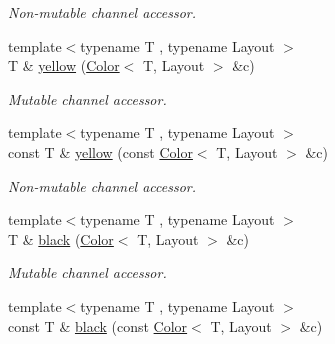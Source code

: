 \begin{DoxyCompactItemize}
\begin{DoxyCompactList}\small\item\em Non-\/mutable channel accessor. \end{DoxyCompactList}\item 
\hypertarget{group___channel_accessors_ga6829ee374a312a1029a0148235540de3}{{\footnotesize template$<$typename T , typename Layout $>$ }\\T \& \hyperlink{group___channel_accessors_ga6829ee374a312a1029a0148235540de3}{yellow} (\hyperlink{class_d_o_1_1_color}{Color}$<$ T, Layout $>$ \&c)}\label{group___channel_accessors_ga6829ee374a312a1029a0148235540de3}

\begin{DoxyCompactList}\small\item\em Mutable channel accessor. \end{DoxyCompactList}\item 
\hypertarget{group___channel_accessors_gac23bd53f11255e8179ab89bf48d050d1}{{\footnotesize template$<$typename T , typename Layout $>$ }\\const T \& \hyperlink{group___channel_accessors_gac23bd53f11255e8179ab89bf48d050d1}{yellow} (const \hyperlink{class_d_o_1_1_color}{Color}$<$ T, Layout $>$ \&c)}\label{group___channel_accessors_gac23bd53f11255e8179ab89bf48d050d1}

\begin{DoxyCompactList}\small\item\em Non-\/mutable channel accessor. \end{DoxyCompactList}\item 
\hypertarget{group___channel_accessors_ga18f2660186c9e25f69ed6fe2d474752c}{{\footnotesize template$<$typename T , typename Layout $>$ }\\T \& \hyperlink{group___channel_accessors_ga18f2660186c9e25f69ed6fe2d474752c}{black} (\hyperlink{class_d_o_1_1_color}{Color}$<$ T, Layout $>$ \&c)}\label{group___channel_accessors_ga18f2660186c9e25f69ed6fe2d474752c}

\begin{DoxyCompactList}\small\item\em Mutable channel accessor. \end{DoxyCompactList}\item 
\hypertarget{group___channel_accessors_gab36760b6e747c3cdcb47643dce670493}{{\footnotesize template$<$typename T , typename Layout $>$ }\\const T \& \hyperlink{group___channel_accessors_gab36760b6e747c3cdcb47643dce670493}{black} (const \hyperlink{class_d_o_1_1_color}{Color}$<$ T, Layout $>$ \&c)}\label{group___channel_accessors_gab36760b6e747c3cdcb47643dce670493}


\end{DoxyCompactItemize}
